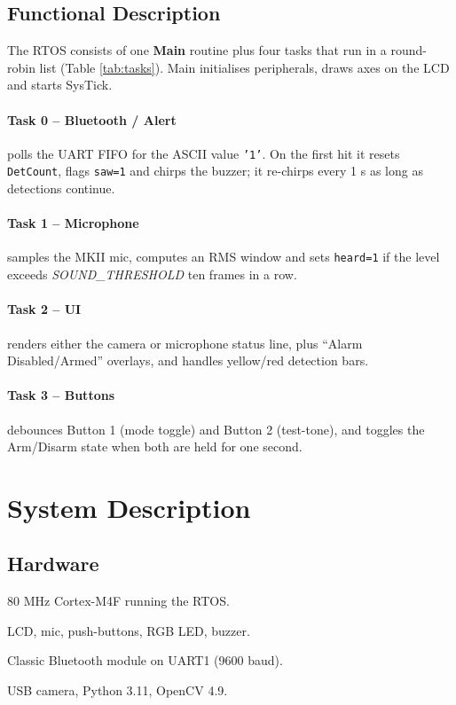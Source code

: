 \documentclass[11pt]{IEEEtran}
\begin{document}
\subsection{Functional Description}
The RTOS consists of one \textbf{Main} routine plus four tasks that
run in a round-robin list (Table \ref{tab:tasks}).  Main initialises
peripherals, draws axes on the LCD and starts SysTick.


\paragraph*{Task 0 – Bluetooth / Alert} polls the UART FIFO for the
ASCII value \texttt{'1'}.  On the first hit it resets \texttt{DetCount},
flags \texttt{saw=1} and chirps the buzzer; it re-chirps every 1 s as
long as detections continue.

\paragraph*{Task 1 – Microphone} samples the MKII mic, computes an RMS
window and sets \texttt{heard=1} if the level exceeds
\textit{SOUND\_THRESHOLD} ten frames in a row.

\paragraph*{Task 2 – UI} renders either the camera or microphone status
line, plus “Alarm Disabled/Armed” overlays, and handles yellow/red
detection bars.

\paragraph*{Task 3 – Buttons} debounces Button 1 (mode toggle) and
Button 2 (test-tone), and toggles the Arm/Disarm state when both are
held for one second.

\section{System Description}
\subsection{Hardware}
\begin{description}[style=nextline]
  \item[Tiva-C TM4C123GXL] 80 MHz Cortex-M4F running the RTOS.
  \item[EduBOOST-MKII] LCD, mic, push-buttons, RGB LED, buzzer.
  \item[HC-05] Classic Bluetooth module on UART1 (9600 baud).
  \item[Laptop (Win/Mac)] USB camera, Python 3.11, OpenCV 4.9.
\end{description}
\end{document}
